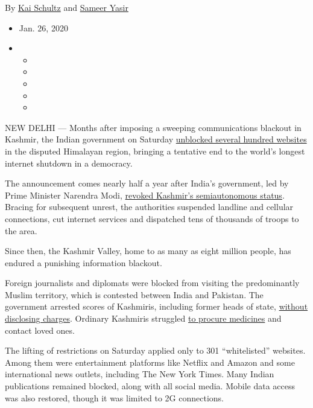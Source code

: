 By \href{https://www.nytimes.com/by/kai-schultz}{Kai Schultz} and
\href{https://www.nytimes.com/by/sameer-yasir}{Sameer Yasir}

\begin{itemize}
\item
  Jan. 26, 2020
\item
  \begin{itemize}
  \item
  \item
  \item
  \item
  \item
  \end{itemize}
\end{itemize}

NEW DELHI --- Months after imposing a sweeping communications blackout
in Kashmir, the Indian government on Saturday
\href{https://thewire.in/government/2g-data-services-to-be-restored-throughout-jammu-kashmir-union-territory}{unblocked
several hundred websites} in the disputed Himalayan region, bringing a
tentative end to the world's longest internet shutdown in a democracy.

The announcement comes nearly half a year after India's government, led
by Prime Minister Narendra Modi,
\href{https://www.nytimes.com/2019/08/05/world/asia/india-pakistan-kashmir-jammu.html}{revoked
Kashmir's semiautonomous status}. Bracing for subsequent unrest, the
authorities suspended landline and cellular connections, cut internet
services and dispatched tens of thousands of troops to the area.

Since then, the Kashmir Valley, home to as many as eight million people,
has endured a punishing information blackout.

Foreign journalists and diplomats were blocked from visiting the
predominantly Muslim territory, which is contested between India and
Pakistan. The government arrested scores of Kashmiris, including former
heads of state,
\href{https://www.nytimes.com/2019/08/23/world/asia/kashmir-arrests-india.html}{without
disclosing charges}. Ordinary Kashmiris struggled
\href{https://www.nytimes.com/2019/10/07/world/asia/kashmir-doctors-phone.html}{to
procure medicines} and contact loved ones.

The lifting of restrictions on Saturday applied only to 301
``whitelisted'' websites. Among them were entertainment platforms like
Netflix and Amazon and some international news outlets, including The
New York Times. Many Indian publications remained blocked, along with
all social media. Mobile data access was also restored, though it was
limited to 2G connections.

